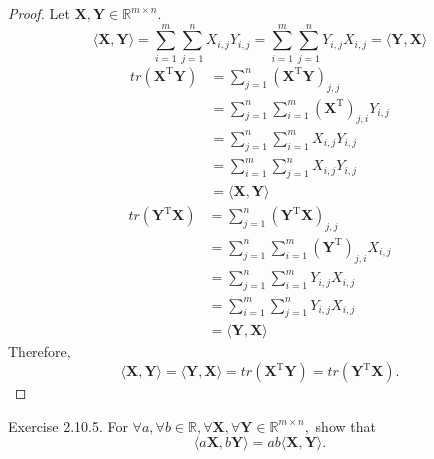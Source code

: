 \documentclass{article}
\theoremstyle{plain}
\begin{document}
\begin{proof}
	Let
	\begin{math}
		\bm{X} , \bm{Y} \in \mathbb{R}^{m \times n} .
	\end{math}
	\begin{equation*}
		\langle \bm{X} , \bm{Y} \rangle = \sum_{i=1}^m \sum_{j=1}^n X_{i,j} Y_{i,j}
		= \sum_{i=1}^m \sum_{j=1}^n Y_{i,j} X_{i,j} = \langle \bm{Y} , \bm{X} \rangle
	\end{equation*}
	\begin{equation*}
		\begin{split}
			tr(\bm{X}^\mathrm{T} \bm{Y}) &= \sum_{j=1}^n (\bm{X}^\mathrm{T} \bm{Y})_{j,j} \\
			&= \sum_{j=1}^n \sum_{i=1}^m (\bm{X}^\mathrm{T})_{j,i} Y_{i,j} \\
			&= \sum_{j=1}^n \sum_{i=1}^m X_{i,j} Y_{i,j} \\
			&= \sum_{i=1}^m \sum_{j=1}^n X_{i,j} Y_{i,j} \\
			&= \langle \bm{X} , \bm{Y} \rangle
		\end{split}
	\end{equation*}
	\begin{equation*}
		\begin{split}
			tr(\bm{Y}^\mathrm{T} \bm{X}) &= \sum_{j=1}^n (\bm{Y}^\mathrm{T} \bm{X})_{j,j} \\
			&= \sum_{j=1}^n \sum_{i=1}^m (\bm{Y}^\mathrm{T})_{j,i} X_{i,j} \\
			&= \sum_{j=1}^n \sum_{i=1}^m Y_{i,j} X_{i,j} \\
			&= \sum_{i=1}^m \sum_{j=1}^n Y_{i,j} X_{i,j} \\
			&= \langle \bm{Y} , \bm{X} \rangle
		\end{split}
	\end{equation*}
	Therefore,
	\begin{equation*}
		\langle \bm{X} , \bm{Y} \rangle = \langle \bm{Y} , \bm{X} \rangle
		= tr(\bm{X}^\mathrm{T} \bm{Y}) = tr(\bm{Y}^\mathrm{T} \bm{X}) .
	\end{equation*}
\end{proof}


\begin{itembox}[l]{Exercise 2.10.5.}
	For
	\begin{math}
		\forall a , \forall b \in \mathbb{R} ,
		\forall \bm{X} , \forall \bm{Y} \in \mathbb{R}^{m \times n} ,
	\end{math}
	show that
	\begin{equation}
		\label{ex2105}
		\langle a \bm{X} , b \bm{Y} \rangle = a b \langle \bm{X} , \bm{Y} \rangle .
	\end{equation}
\end{itembox}
\end{document}
